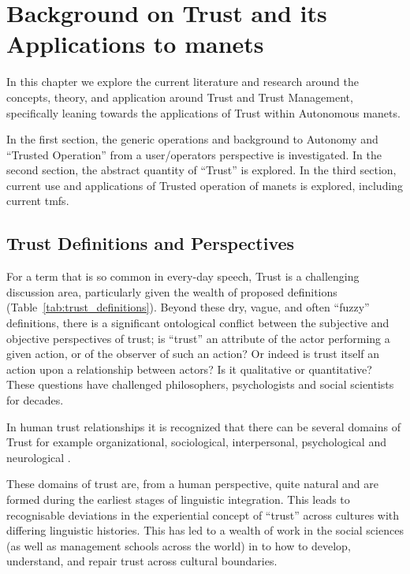 \def\ChapterTitle{Background on Trust and its Applications to \gls{manet}s} %
\ifx\ifthesis\undefined

\else
\chapter{\ChapterTitle}
\label{Chapter\thechapter}
\fi
In this chapter we explore the current literature and research around the concepts, theory, and application around Trust and Trust Management, specifically leaning towards the applications of Trust within Autonomous \glspl{manet}.

In the first section, the generic operations and background to Autonomy and ``Trusted Operation'' from a user/operators perspective is investigated. 
In the second section, the abstract quantity of ``Trust'' is explored.
In the third section, current use and applications of Trusted operation of \glspl{manet} is explored, including current \glspl{tmf}.


\section{Trust Definitions and Perspectives}

For a term that is so common in every-day speech, Trust is a challenging discussion area, particularly given the wealth of proposed definitions (Table~\ref{tab:trust_definitions}).
Beyond these dry, vague, and often ``fuzzy'' definitions, there is a significant ontological conflict between the subjective and objective perspectives of trust; is ``trust'' an attribute of the actor performing a given action, or of the observer of such an action? Or indeed is trust itself an action upon a relationship between actors? Is it qualitative or quantitative? These questions have challenged philosophers, psychologists and social scientists for decades.

In human trust relationships it is recognized that there can be several domains of Trust for example organizational, sociological, interpersonal, psychological and neurological \cite{Lee2004}.

These domains of trust are, from a human perspective, quite natural and are formed during the earliest stages of linguistic integration.
This leads to recognisable deviations in the experiential concept of ``trust'' across cultures with differing linguistic histories.
This has led to a wealth of work in the social sciences (as well as management schools across the world) in to how to develop, understand, and repair trust across cultural boundaries.\cite{Okumura2011} 

